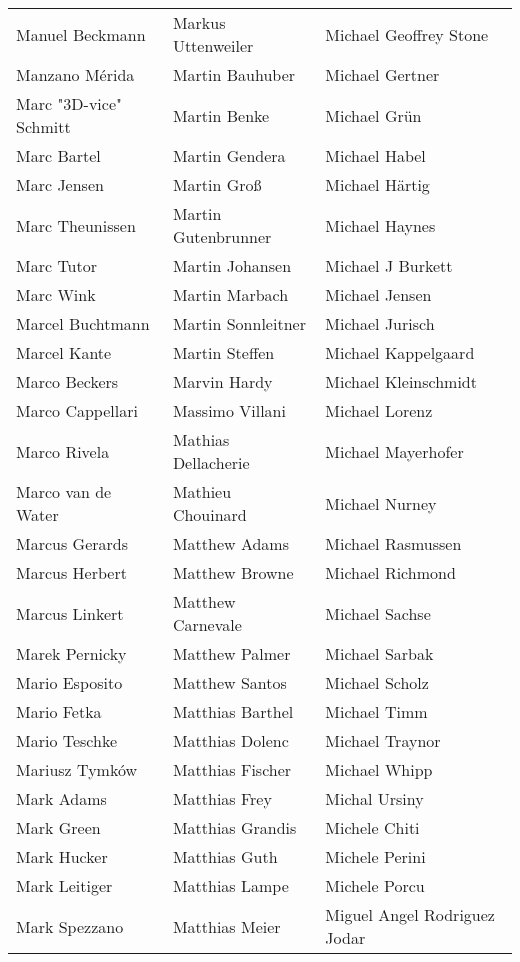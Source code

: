 \begin{tabular}{p{4.5cm}p{4.5cm}p{4.5cm}}
Manuel Beckmann & Markus Uttenweiler & Michael Geoffrey Stone \\
Manzano Mérida & Martin Bauhuber & Michael Gertner \\
Marc "3D-vice" Schmitt & Martin Benke & Michael Grün \\
Marc Bartel & Martin Gendera & Michael Habel \\
Marc Jensen & Martin Groß & Michael Härtig \\
Marc Theunissen & Martin Gutenbrunner & Michael Haynes \\
Marc Tutor & Martin Johansen & Michael J Burkett \\
Marc Wink & Martin Marbach & Michael Jensen \\
Marcel Buchtmann & Martin Sonnleitner & Michael Jurisch \\
Marcel Kante & Martin Steffen & Michael Kappelgaard \\
Marco Beckers & Marvin Hardy & Michael Kleinschmidt \\
Marco Cappellari & Massimo Villani & Michael Lorenz \\
Marco Rivela & Mathias Dellacherie & Michael Mayerhofer \\
Marco van de Water & Mathieu Chouinard & Michael Nurney \\
Marcus Gerards & Matthew Adams & Michael Rasmussen \\
Marcus Herbert & Matthew Browne & Michael Richmond \\
Marcus Linkert & Matthew Carnevale & Michael Sachse \\
Marek Pernicky & Matthew Palmer & Michael Sarbak \\
Mario Esposito & Matthew Santos & Michael Scholz \\
Mario Fetka & Matthias Barthel & Michael Timm \\
Mario Teschke & Matthias Dolenc & Michael Traynor \\
Mariusz Tymków & Matthias Fischer & Michael Whipp \\
Mark Adams & Matthias Frey & Michal Ursiny \\
Mark Green & Matthias Grandis & Michele Chiti \\
Mark Hucker & Matthias Guth & Michele Perini \\
Mark Leitiger & Matthias Lampe & Michele Porcu \\
Mark Spezzano & Matthias Meier & Miguel Angel Rodriguez Jodar \\

\end{tabular}
